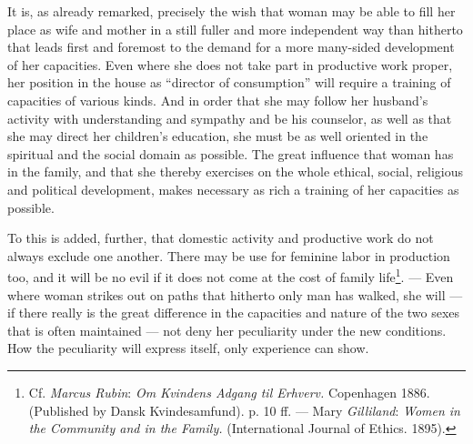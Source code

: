 \documentclass[12pt,a4paper,openany]{book}
\newcommand{\opage}[1]{\marginnote{\footnotesize\textit{[#1]}}}
\begin{document}
It is, as already remarked, precisely the wish that woman may be able to fill her place as wife and mother in a still
fuller and more independent way than hitherto that leads first and foremost to the demand for a more many-sided
development of
\opage{317}her capacities. Even where she does not take part in productive work proper, her position in the house as
``director of consumption'' will require a training of capacities of various kinds. And in order that she may follow her
husband's activity with understanding and sympathy and be his counselor, as well as that she may direct her children's
education, she must be as well oriented in the spiritual and the social domain as possible. The great influence that
woman has in the family, and that she thereby exercises on the whole ethical, social, religious and political
development, makes necessary as rich a training of her capacities as possible.

To this is added, further, that domestic activity and productive work do not always exclude one another. There may be
use for feminine labor in production too, and it will be no evil if it does not come at the cost of family
life\footnote[1]{Cf. \emph{Marcus Rubin}: \textit{Om Kvindens Adgang til Erhverv.} Copenhagen 1886. (Published by Dansk
Kvindesamfund). p. 10 ff. --- Mary \emph{Gilliland}: \textit{Women in the Community and in the Family.} (International Journal of
Ethics. 1895).}. --- Even where woman strikes out on paths that hitherto only man has walked, she will --- if there
really is the great difference in the capacities and nature of the two sexes that is often maintained --- not deny her
peculiarity under the new conditions. How the peculiarity will express itself, only experience can show.
\end{document}
